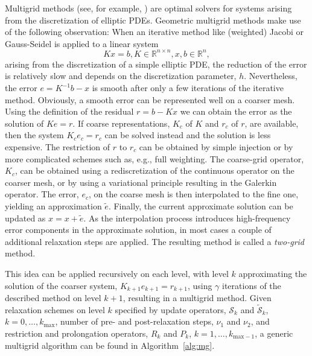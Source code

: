 Multigrid methods (see, for
example, \cite{WLBriggs_VEHenson_SFMcCormick_2000a, UTrottenberg_etal_2001a}) are optimal solvers for systems arising from the
discretization of elliptic PDEs. Geometric multigrid methods make use
of the following observation: When an iterative method like (weighted)
Jacobi or Gauss-Seidel is applied to a linear system
\[
  K x = b, K \in \mathbb{R}^{n \times n}, x, b \in \mathbb{R}^n,
\]
arising from the discretization of a simple elliptic PDE, the
reduction of the error is relatively slow and depends on the
discretization parameter, $h$. Nevertheless, the error $e = K^{-1} b -
x$ is smooth after only a few iterations of the iterative
method. Obviously, a smooth error can be represented well on a coarser
mesh. Using the definition of the residual $r = b - K x$ we can obtain
the error as the solution of $K e = r$. If coarse representations,
$K_c$ of $K$ and $r_c$ of $r$, are available, then the system $K_c e_c = r_c$
can be solved instead and the solution is less expensive. The
restriction of $r$ to $r_c$ can be obtained by simple injection or by
more complicated schemes such as, e.g., full weighting. The coarse-grid
operator, $K_c$, can be obtained using a rediscretization of the
continuous operator on the coarser mesh, or by using a variational
principle resulting in the Galerkin operator. The error, $e_c$, on the
coarse mesh is then interpolated to the fine one, yielding an
approximation $\tilde{e}$. Finally, the current approximate solution
can be updated as $x = x + \tilde{e}$. As the interpolation process
introduces high-frequency error components in the approximate
solution, in most cases a couple of additional relaxation steps are
applied. The resulting method is called a
\emph{two-grid} method.

This idea can be applied recursively on each level, with level
$k$ approximating the solution of the coarser system, $K_{k+1} e_{k+1} = r_{k+1}$,
using $\gamma$ iterations of the described method on
level $k+1$, resulting in a multigrid method. Given relaxation
schemes on level $k$ specified by update operators,
$\mathcal{S}_k$ and $\tilde{\mathcal{S}}_k$,
$k = 0,\dots,k_\text{max}$, number of pre- and post-relaxation steps, $\nu_1$ and $\nu_2$, and restriction and prolongation operators,
$R_k$ and $P_k$, $k = 1,\dots,k_{\text{max}-1}$, a generic
multigrid algorithm can be found in Algorithm~\ref{alg:mg}.

